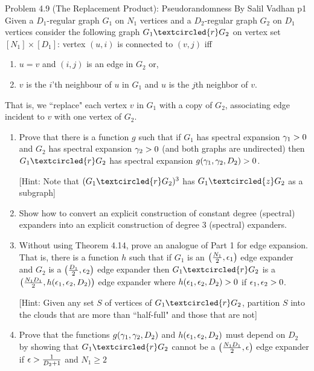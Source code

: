 \documentclass[a4paper, 11pt]{article}
\begin{document}
\begin{problem}{%
		Problem 4.9 (The Replacement Product): Pseudorandomness By Salil Vadhan
	}{p1%
}
Given a $D_1$-regular graph $G_1$ on $N_1$ vertices and a $D_2$-regular graph $G_2$ on $D_1$ vertices consider the following graph $G_1\textcircled{r}G_2$ on vertex set $[N_1]\times [D_1]$: vertex $(u,i)$ is connected to $(v,j)$ iff \begin{enumerate}[label=(\alph*)]
	\item $u=v$ and $(i,j)$ is an edge in $G_2$ or,
	\item $v$ is the $i$'th neighbour of $u$ in $G_1$ and $u$ is the $j$th neighbor of $v$. 
\end{enumerate}
That is, we ``replace" each vertex $v$ in $G_1$ with a copy of $G_2$, associating edge incident to $v$ with one vertex of $G_2$.
\begin{enumerate}
	\item Prove that there is a function $g$ such that if $G_1$ has spectral expansion $\gamma_1>0$ and $G_2$ has spectral expansion $\gamma_2>0$ (and both graphs are undirected) then $G_1\textcircled{r}G_2$ has spectral expansion $g(\gamma_1,\gamma_2,D_2)>0$.
	
	[Hint: Note that $(G_1\textcircled{r}G_2)^3$ has $G_1\textcircled{z}G_2$ as a subgraph]
	\item Show how to convert an explicit construction of constant degree (spectral) expanders into an explicit construction of degree 3 (spectral) expanders.
	\item Without using Theorem 4.14, prove an analogue of Part 1 for edge expansion. That is, there is a function $h$ such that if $G_1$ is an $\left(\frac{N_1}2,\epsilon_1\right)$ edge expander and $G_2$ is a $\left(\frac{D_1}2,\epsilon_2\right)$ edge expander then $G_1\textcircled{r}G_2$ is a $\left(\frac{N_1D_1}{2},h(\epsilon_1,\epsilon_2,D_2)\right)$ edge expander where $h(\epsilon_1,\epsilon_2,D_2)>0$ if $\epsilon_1,\epsilon_2>0$. 
	
	[Hint: Given any set $S$ of vertices of $G_1\textcircled{r}G_2$, partition $S$ into the clouds that are more than ``half-full" and those that are not]
	\item Prove that the functions $g(\gamma_1,\gamma_2,D_2)$ and $h(\epsilon_1,\epsilon_2,D_2)$ must depend on $D_2$ by showing that $G_1\textcircled{r}G_2$ cannot be a $\left(\frac{N_1D_1}2,\epsilon\right)$ edge expander if $\epsilon>\frac1{D_2+1}$ and $N_1\geq 2$
\end{enumerate}
\end{problem}
\end{document}
